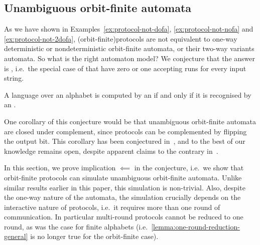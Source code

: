 \subsection{Unambiguous orbit-finite automata}
\label{sec:unambiguous-orbit-finite-automata}
\AP
As we have shown in Examples~\ref{ex:protocol-not-dofa},
\ref{ex:protocol-not-nofa} and \ref{ex:protocol-not-2dofa},
\kl(orbit-finite){protocols} are not equivalent to one-way deterministic or
nondeterministic orbit-finite automata, or their two-way variants automata. So
what is the right automaton model?  We conjecture that the answer is
, i.e.~the special case of
 that have zero or one accepting runs for
every input string.

\begin{conjecture}
    \label{conj:protocols-unambiguous}
    A language over an  alphabet is computed by 
    an  if and only if it is recognised by an .
\end{conjecture}

One corollary of this conjecture would be that unambiguous orbit-finite
automata are closed under complement, since protocols can be complemented by
flipping the output bit. This corollary has been conjectured
in~\cite[p.9]{colcombet2012forms}, and to the best of our knowledge remains
open, despite apparent claims to the contrary in~\cite[Footnote
5]{colcombet2015unambiguity}.

In this section, we prove implication $\impliedby$ in the conjecture, i.e.~we show that orbit-finite protocols can simulate  unambiguous orbit-finite automata. Unlike similar results earlier in this paper, this simulation is non-trivial. Also, despite the one-way nature of the automata, the simulation crucially depends on the interactive nature of protocols, i.e.~it requires more than one round of communication. In particular multi-round protocols cannot be reduced to one round, as was the case for finite alphabets
(i.e.~\cref{lemma:one-round-reduction-general} is no longer true for the orbit-finite case).


